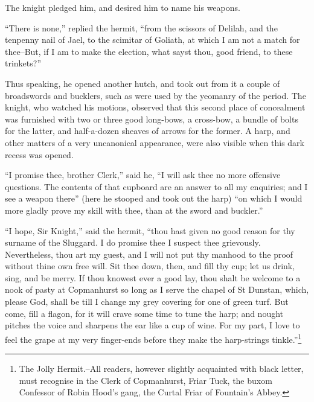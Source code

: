 The knight pledged him, and desired him to name his weapons.

``There is none,'' replied the hermit, ``from the scissors of Delilah,
and the tenpenny nail of Jael, to the scimitar of Goliath, at which I am
not a match for thee--But, if I am to make the election, what sayst
thou, good friend, to these trinkets?''

Thus speaking, he opened another hutch, and took out from it a couple of
broadswords and bucklers, such as were used by the yeomanry of the
period. The knight, who watched his motions, observed that this second
place of concealment was furnished with two or three good long-bows, a
cross-bow, a bundle of bolts for the latter, and half-a-dozen sheaves of
arrows for the former. A harp, and other matters of a very uncanonical
appearance, were also visible when this dark recess was opened.

``I promise thee, brother Clerk,'' said he, ``I will ask thee no more
offensive questions. The contents of that cupboard are an answer to all
my enquiries; and I see a weapon there'' (here he stooped and took out
the harp) ``on which I would more gladly prove my skill with thee, than
at the sword and buckler.''

``I hope, Sir Knight,'' said the hermit, ``thou hast given no good
reason for thy surname of the Sluggard. I do promise thee I suspect thee
grievously. Nevertheless, thou art my guest, and I will not put thy
manhood to the proof without thine own free will. Sit thee down, then,
and fill thy cup; let us drink, sing, and be merry. If thou knowest ever
a good lay, thou shalt be welcome to a nook of pasty at Copmanhurst so
long as I serve the chapel of St Dunstan, which, please God, shall be
till I change my grey covering for one of green turf. But come, fill a
flagon, for it will crave some time to tune the harp; and nought pitches
the voice and sharpens the ear like a cup of wine. For my part, I love
to feel the grape at my very finger-ends before they make the
harp-strings tinkle.''\footnote{The Jolly Hermit.--All readers,
however slightly
acquainted with black letter, must recognise in the Clerk of
Copmanhurst, Friar Tuck, the buxom Confessor of Robin Hood's gang, the
Curtal Friar of Fountain's Abbey.}
